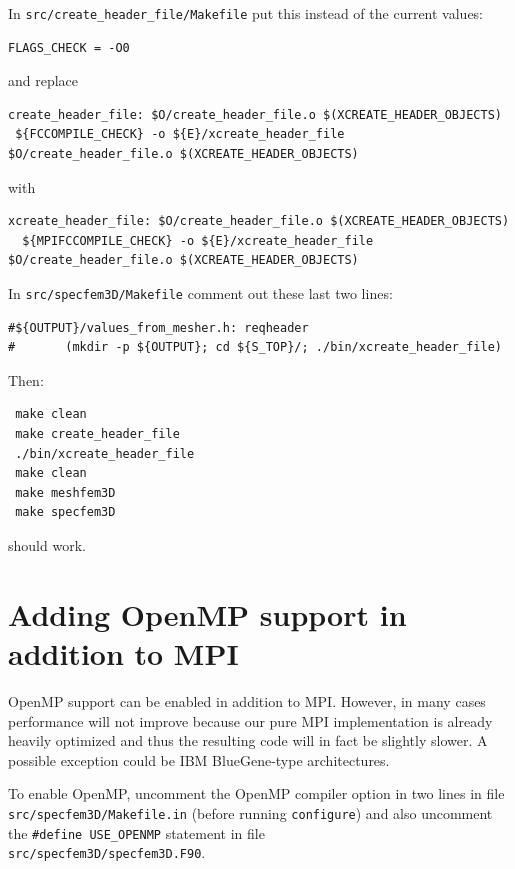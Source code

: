 \documentclass[oneside,english]{book}
\begin{document}
\noindent
In \texttt{src/create\_header\_file/Makefile} put this instead of the current values:

\begin{verbatim}
FLAGS_CHECK = -O0
\end{verbatim}

\noindent
and replace

\begin{verbatim}
create_header_file: $O/create_header_file.o $(XCREATE_HEADER_OBJECTS)
 ${FCCOMPILE_CHECK} -o ${E}/xcreate_header_file $O/create_header_file.o $(XCREATE_HEADER_OBJECTS)
\end{verbatim}

\noindent
with

\begin{verbatim}
xcreate_header_file: $O/create_header_file.o $(XCREATE_HEADER_OBJECTS)
  ${MPIFCCOMPILE_CHECK} -o ${E}/xcreate_header_file $O/create_header_file.o $(XCREATE_HEADER_OBJECTS)
\end{verbatim}

\noindent
In \texttt{src/specfem3D/Makefile} comment out these last two lines:

\begin{verbatim}
#${OUTPUT}/values_from_mesher.h: reqheader
#       (mkdir -p ${OUTPUT}; cd ${S_TOP}/; ./bin/xcreate_header_file)
\end{verbatim}

\noindent
Then:

\begin{verbatim}
 make clean
 make create_header_file
 ./bin/xcreate_header_file
 make clean
 make meshfem3D
 make specfem3D
\end{verbatim}

\noindent
should work.

\section{Adding OpenMP support in addition to MPI}

OpenMP support can be enabled in addition to MPI. However, in many cases performance will not improve
because our pure MPI implementation is already heavily optimized and thus the resulting code will in fact
be slightly slower. A possible exception could be IBM BlueGene-type architectures.

To enable OpenMP, uncomment the OpenMP compiler option in two lines in file \texttt{src/specfem3D/Makefile.in}
(before running \texttt{configure}) and also uncomment the \texttt{\#define USE\_OPENMP} statement in file\\
\texttt{src/specfem3D/specfem3D.F90}.
\end{document}
